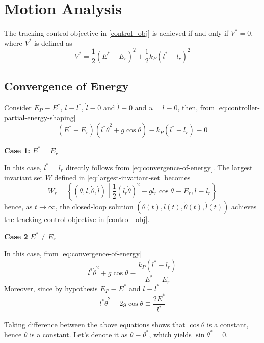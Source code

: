\documentclass[main.tex]{subfiles}
\begin{document}
\section{Motion Analysis}
\label{sec:motion-analysis}
The tracking control objective in \eqref{control_obj} is 
achieved if and only if $V^* = 0$, where $V^*$ is defined as
\begin{equation}
  V^* = \frac{1}{2}(E^*-E_r)^2+\frac{1}{2}k_P(l^*-l_r)^2
\end{equation}
\subsection{Convergence of Energy}
\label{subsec:convergence-of-energy}
Consider $E_P \equiv E^*$, $l \equiv l^*$, $\dot{l} \equiv 0$ and
$\dot{l} \equiv 0$ and $u = \ddot{l} \equiv 0$, then, from
\eqref{eq:controller-partial-energy-shaping}
\begin{equation}
  \label{eq:convergence-of-energy}
  (E^*-E_r)(l^*\dot{\theta}^2+g\cos\theta)-k_P(l^*-l_r) \equiv 0
\end{equation}

\noindent \textbf{Case 1:} $E^* = E_r$

In this case, $l^* = l_r$ directly follows from 
\eqref{eq:convergence-of-energy}. The largest invariant set $W$
defined in \eqref{eq:largest-invariant-set} becomes
\begin{equation}
  \label{eq:def-Wr}
  W_r = \left\{ (\theta, l, \dot{\theta}, \dot{l})
    \middle| \frac{1}{2} (l_r \dot{\theta})^2 -
    g l_r \cos\theta \equiv E_r, l \equiv l_r \right\}
\end{equation}
hence, as $t \to \infty$, the closed-loop solution
$(\theta(t), l(t), \dot{\theta}(t), \dot{l}(t))$ achieves the
tracking control objective in \eqref{control_obj}.

\noindent \textbf{Case 2} $E^* \neq E_r$

In this case, from \eqref{eq:convergence-of-energy}
\begin{equation}
  l^* \dot{\theta}^2 + g\cos\theta \equiv 
  \frac{k_P(l^*-l_r)}{E^*-E_r}
\end{equation}
Moreover, since by hypothesis $E_P \equiv E^*$ and $l 
\equiv l^*$
\begin{equation}
  l^* \dot{\theta}^2 - 2g\cos\theta \equiv \frac{2E^*}{l^*}
\end{equation}

Taking difference between the above equations shows that
$\cos\theta$ is a constant, hence $\theta$ is a constant.
Let's denote it as $\theta \equiv \theta^*$, which yields
$\sin\theta^*=0$.
\end{document}
